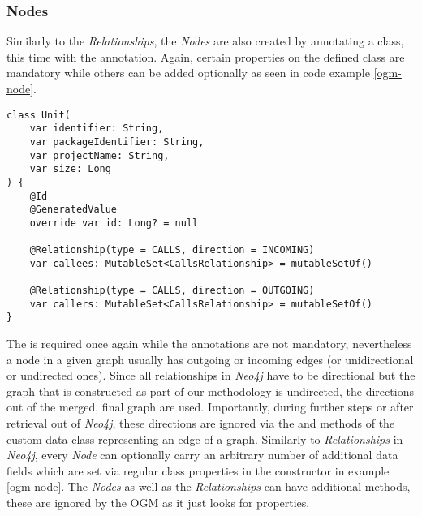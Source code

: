 \documentclass[12pt,a4paper]{report}
\begin{document}
\subsubsection{Nodes}
Similarly to the \textit{Relationships}, the \textit{Nodes}
are also created by annotating a class, this time with the 
annotation. Again, certain properties on the defined class are
mandatory while others can be added optionally as seen in code example
\ref{ogm-node}.
\begin{lstlisting}[caption=Node OGM class, label=ogm-node, breaklines=true]
class Unit(
    var identifier: String,
    var packageIdentifier: String,
    var projectName: String,
    var size: Long
) {
    @Id
    @GeneratedValue
    override var id: Long? = null

    @Relationship(type = CALLS, direction = INCOMING)
    var callees: MutableSet<CallsRelationship> = mutableSetOf()

    @Relationship(type = CALLS, direction = OUTGOING)
    var callers: MutableSet<CallsRelationship> = mutableSetOf()
}
\end{lstlisting}
The  is
required once again while the  annotations are not
mandatory, nevertheless a node in a given graph usually has outgoing or
incoming edges (or unidirectional or undirected ones). Since all relationships
in \textit{Neo4j} have to be directional but the graph that is constructed as
part of our methodology is undirected, the directions out of the merged, final
graph are used. Importantly, during further steps or after retrieval out of
\textit{Neo4j}, these directions are ignored via the  and  methods of the custom data class representing an edge of a graph.
Similarly to \textit{Relationships} in \textit{Neo4j}, every \textit{
Node} can optionally carry an arbitrary number of additional data fields which
are set via regular class properties in the constructor in example
\ref{ogm-node}. The \textit{Nodes} as well as the \textit{Relationships}
can have additional methods, these are ignored by the OGM as it just looks for
properties.
\end{document}
